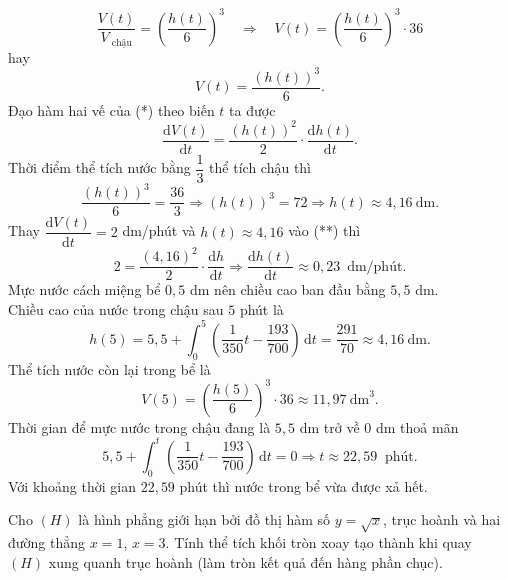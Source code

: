 \begin{ex}
{\begin{itemchoice}
\[			 \dfrac{V(t)}{V_{\text{ chậu}}}=\left(\dfrac{h(t)}{6}\right)^3\quad\Rightarrow\quad V(t)=\left(\dfrac{h(t)}{6}\right)^3\cdot 36
			\] 
			hay 
			\[ 
			V(t)=\dfrac{\left( h(t)\right) ^3}{6}.  \tag{*}
			 \]
			Đạo hàm hai vế của  (*) theo biến $t$ ta được
			 \[
			 \dfrac{\mathrm{d}V(t)}{\mathrm{d}t}=\dfrac{(h(t))^2}{2}\cdot \dfrac{\mathrm{d}h(t)}{\mathrm{d}t}. \tag{**}
			\] 
			Thời điểm thể tích nước bằng $\dfrac{1}{3}$  thể tích chậu thì
			\[ 
			 \dfrac{(h(t))^3}{6}=\dfrac{36}{3}\Rightarrow (h(t))^3=72\Rightarrow h(t)\approx 4{,}16\ \mathrm{dm}.
			\] 
			Thay $\dfrac{\mathrm{d}V(t)}{\mathrm{d}t}=2$  dm/phút và $h(t)\approx 4{,}16$ vào (**) thì
			\[ 
			2=\dfrac{(4{,}16)^2}{2}\cdot  \dfrac{\mathrm{d}h}{\mathrm{d}t}\Rightarrow \dfrac{\mathrm{d}h(t)}{\mathrm{d}t}\approx 0{,}23 \,\text{ dm/phút}.
			 \]
			\itemch 
			Mực nước cách miệng bể $0{,}5$  dm nên chiều cao ban đầu bằng $5{,}5$ dm.\\
			Chiều  cao của nước trong chậu sau $5$ phút là
			 \[
			h(5)=5{,}5+\displaystyle\int_0^5\left(\dfrac{1}{350}t-\dfrac{193}{700}\right) \mathrm{\,d}t=\dfrac{291}{70}\approx 4{,}16\ \mathrm{dm}. 
			 \]
			Thể tích nước còn lại trong  bể là
			\[ 
			V(5)=\left(\dfrac{h(5)}{6}\right)^3\cdot  36\approx 11{,}97\ \mathrm{dm}^3.
			 \]
			\itemch 
			Thời gian để  mực nước trong chậu đang là $5{,}5$ dm trở về $0$ dm thoả mãn
			\[ 
			5{,}5+\displaystyle\int_0^t\left(\dfrac{1}{350}t-\dfrac{193}{700}\right)\mathrm{\,d}t=0\Rightarrow t\approx 22{,}59\  \text{ phút}.
			 \]
			Với khoảng thời gian $22{,}59$ phút thì nước trong  bể vừa được xả hết.
		\end{itemchoice}
	} 
\end{ex}



\begin{bt}%
	Cho $(H)$ là hình phẳng giới hạn  bởi đồ thị hàm số $y=\sqrt{x}$, trục hoành và hai đường thẳng $x=1$, $x=3$. Tính thể tích khối tròn xoay tạo thành khi quay $(H)$ xung quanh trục hoành (làm tròn kết quả đến hàng phần chục).
\end{bt}

